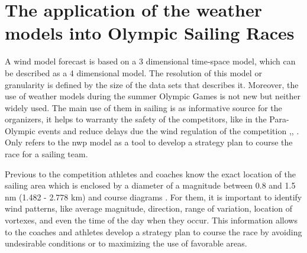 



\section{The application of the weather models into Olympic Sailing Races}

A wind model forecast is based on a 3 dimensional time-space model, which can be described as a 4 dimensional model. The resolution of this model or granularity is defined by the size of the data sets that describes it. Moreover, the use of weather models during the summer Olympic Games is not new but neither widely used. The main use of them in sailing is as informative source for the organizers, it helps to warranty the safety of the competitors, like in the Para-Olympic events and reduce delays due the wind regulation of the competition  \cite{spark2004wind},\cite{sheng2009structure}, \cite{golding2014forecasting}. Only \cite{giannaros2018ultrahigh} %
refers to the \acrshort{nwp} model as a tool to develop a strategy plan to course the race for a sailing team. \par 

Previous to the competition athletes and coaches know the exact location of the sailing area which is enclosed by a diameter of a magnitude between 0.8 and 1.5 nm (1.482 - 2.778 km) and course diagrams \cite{SailRaceRio}. For them, it is important to identify wind patterns, like average magnitude, direction, range of variation, location of vortexes, and even the time of the day when they occur. This information allows to the coaches and athletes develop a strategy plan to course the race by avoiding undesirable conditions or to maximizing the use of favorable areas.\par

